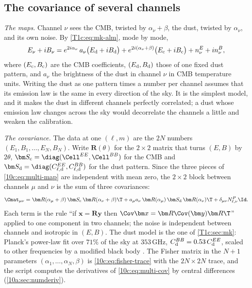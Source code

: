 \subsection{The covariance of several channels}
\label{10c:sec:multi-cov}

\emph{The maps.} Channel $\nu$ sees the CMB, twisted by $\alpha_\nu+\beta$, the dust, twisted by $\alpha_\nu$, and its own
noise. By \cref{T1c:eq:mk-alm}, mode by mode,
\begin{equation}
  E_\nu+iB_\nu=e^{2i\alpha_\nu}\,a_\nu\bigl(E_{\rm d}+iB_{\rm d}\bigr)+e^{2i(\alpha_\nu+\beta)}\bigl(E_{\rm c}+iB_{\rm c}\bigr)+n^E_\nu+in^B_\nu ,
  \label{10c:eq:multi-map}
\end{equation}
where $(E_{\rm c},B_{\rm c})$ are the CMB coefficients, $(E_{\rm d},B_{\rm d})$ those of one fixed dust pattern, and $a_\nu$
the brightness of the dust in channel $\nu$ in CMB temperature units. Writing the dust as one pattern times a
number per channel assumes that its emission law is the same in every direction of the sky. It is the simplest
model, and it makes the dust in different channels perfectly correlated; a dust whose emission law changes across
the sky would decorrelate the channels a little and weaken the calibration.

\emph{The covariance.} The data at one $(\ell,m)$ are the $2N$ numbers $(E_1,B_1,\dots,E_N,B_N)$. Write $\bm R(\theta)$ for
the $2\times2$ matrix that turns $(E,B)$ by $2\theta$, $\bm S_{\rm c}=\diag(\Cell^{EE},\Cell^{BB})$ for the CMB and
$\bm S_{\rm d}=\diag(C^{EE}_{\ell,\rm d},C^{BB}_{\ell,\rm d})$ for the dust pattern. Since the three pieces of
\eqref{10c:eq:multi-map} are independent with mean zero, the $2\times2$ block between channels $\mu$ and $\nu$ is the sum
of three covariances:
\begin{equation}
  \Cmat_{\mu\nu}=\bm R(\alpha_\mu+\beta)\,\bm S_{\rm c}\,\bm R(\alpha_\nu+\beta)\T
                +a_\mu a_\nu\,\bm R(\alpha_\mu)\,\bm S_{\rm d}\,\bm R(\alpha_\nu)\T
                +\delta_{\mu\nu}N^P_{\ell,\nu}\Id .
  \label{10c:eq:multi-cov}
\end{equation}
Each term is the rule ``if $\bm x=\bm R\bm y$ then $\Cov\bm x=\bm R\Cov(\bm y)\bm R\T$'' applied to one component in two
channels; the noise is independent between channels and isotropic in $(E,B)$. The dust model is the one of
\cref{T1c:sec:mk}: Planck's power-law fit over $71\%$ of the sky at $353\,$GHz, $C^{BB}_{\rm d}=0.53\,C^{EE}_{\rm d}$, scaled
to other frequencies by a modified black body \cite{Planck2018XI}. The Fisher matrix in the $N+1$ parameters
$(\alpha_1,\dots,\alpha_N,\beta)$ is \eqref{10c:eq:fisher-trace} with the $2N\times2N$ trace, and the script computes the
derivatives of \eqref{10c:eq:multi-cov} by central differences (\cref{10a:sec:numderiv}).

